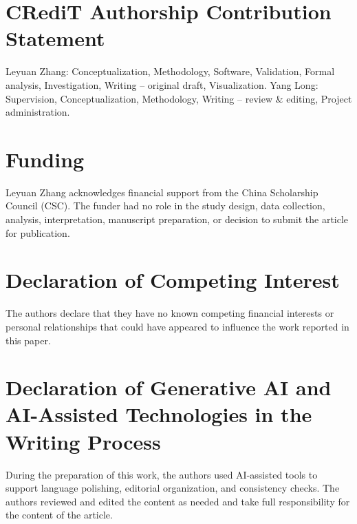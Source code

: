 \section*{CRediT Authorship Contribution Statement}

Leyuan Zhang: Conceptualization, Methodology, Software, Validation, Formal analysis, Investigation, Writing -- original draft, Visualization. Yang Long: Supervision, Conceptualization, Methodology, Writing -- review \& editing, Project administration.

\section*{Funding}

Leyuan Zhang acknowledges financial support from the China Scholarship Council (CSC). The funder had no role in the study design, data collection, analysis, interpretation, manuscript preparation, or decision to submit the article for publication.

\section*{Declaration of Competing Interest}

The authors declare that they have no known competing financial interests or personal relationships that could have appeared to influence the work reported in this paper.

\section*{Declaration of Generative AI and AI-Assisted Technologies in the Writing Process}

During the preparation of this work, the authors used AI-assisted tools to support language polishing, editorial organization, and consistency checks. The authors reviewed and edited the content as needed and take full responsibility for the content of the article.
